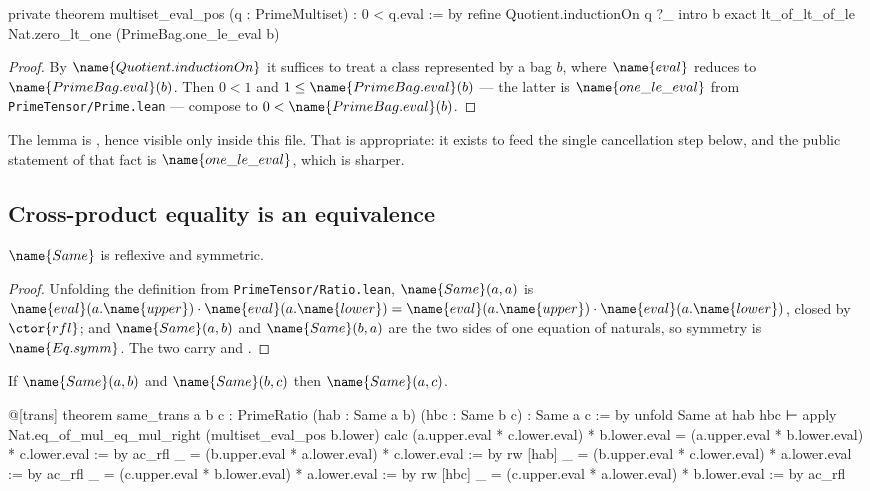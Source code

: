 \begin{leancode}
private theorem multiset_eval_pos (q : PrimeMultiset) : 0 < q.eval := by
  refine Quotient.inductionOn q ?_
  intro b
  exact lt_of_lt_of_le Nat.zero_lt_one (PrimeBag.one_le_eval b)
\end{leancode}

\begin{proof}
By $\name{Quotient.inductionOn}$ it suffices to treat a class represented by a
bag $b$, where $\name{eval}$ reduces to $\name{PrimeBag.eval}(b)$.  Then
$0 < 1$ and $1 \leq \name{PrimeBag.eval}(b)$ ---
the latter is $\name{one\_le\_eval}$ from \texttt{PrimeTensor/Prime.lean} ---
compose to $0 < \name{PrimeBag.eval}(b)$.
\end{proof}

The lemma is , hence visible only inside this file.  That is
appropriate: it exists to feed the single cancellation step below, and the
public statement of that fact is $\name{one\_le\_eval}$, which is sharper.

\subsection{Cross-product equality is an equivalence}

\begin{lemma}\label{MulRat:lem:refl-symm}
$\name{Same}$ is reflexive and symmetric.
\end{lemma}

\begin{proof}
Unfolding the definition from \texttt{PrimeTensor/Ratio.lean},
$\name{Same}(a,a)$ is
$\name{eval}(a.\name{upper}) \cdot \name{eval}(a.\name{lower})
 = \name{eval}(a.\name{upper}) \cdot \name{eval}(a.\name{lower})$,
closed by $\ctor{rfl}$; and $\name{Same}(a,b)$ and $\name{Same}(b,a)$ are the
two sides of one equation of naturals, so symmetry is $\name{Eq.symm}$.  The
two carry  and .
\end{proof}

\begin{lemma}\label{MulRat:lem:trans}
If $\name{Same}(a,b)$ and $\name{Same}(b,c)$ then $\name{Same}(a,c)$.
\end{lemma}

\begin{leancode}
@[trans] theorem same_trans {a b c : PrimeRatio}
    (hab : Same a b) (hbc : Same b c) : Same a c := by
  unfold Same at hab hbc ⊢
  apply Nat.eq_of_mul_eq_mul_right (multiset_eval_pos b.lower)
  calc
    (a.upper.eval * c.lower.eval) * b.lower.eval
        = (a.upper.eval * b.lower.eval) * c.lower.eval := by ac_rfl
    _ = (b.upper.eval * a.lower.eval) * c.lower.eval := by rw [hab]
    _ = (b.upper.eval * c.lower.eval) * a.lower.eval := by ac_rfl
    _ = (c.upper.eval * b.lower.eval) * a.lower.eval := by rw [hbc]
    _ = (c.upper.eval * a.lower.eval) * b.lower.eval := by ac_rfl
\end{leancode}

